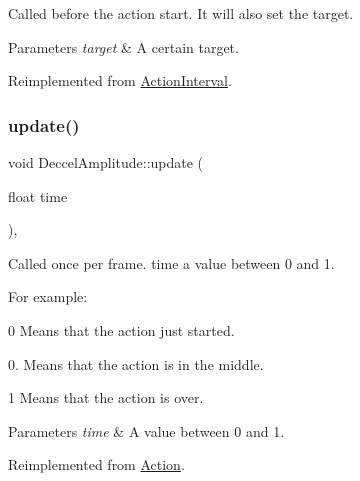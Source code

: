 Called before the action start. It will also set the target.


\begin{DoxyParams}{Parameters}
{\em target} & A certain target. \\
\hline
\end{DoxyParams}


Reimplemented from \hyperlink{classActionInterval_ad3d91186b2c3108488ddbbdbbd982484}{Action\+Interval}.

\mbox{\label{classDeccelAmplitude_a723e93602a70792b77435283425d0403}} 
\subsubsection{\texorpdfstring{update()}{update()}\hspace{0.1cm}{\footnotesize\ttfamily [1/2]}}
{\footnotesize\ttfamily void Deccel\+Amplitude\+::update (\begin{DoxyParamCaption}\item[{float}]{time }\end{DoxyParamCaption})\hspace{0.3cm}{\ttfamily [override]}, {\ttfamily [virtual]}}

Called once per frame. time a value between 0 and 1.

For example\+:
\begin{DoxyItemize}
\item 0 Means that the action just started.
\item 0. Means that the action is in the middle.
\item 1 Means that the action is over.
\end{DoxyItemize}


\begin{DoxyParams}{Parameters}
{\em time} & A value between 0 and 1. \\
\hline
\end{DoxyParams}


Reimplemented from \hyperlink{classAction_a937e646e63915e33ad05ba149bfcf239}{Action}.

\mbox{\label{classDeccelAmplitude_aaba8cfb70eadc2c0c4d732dbc8280731}} 
